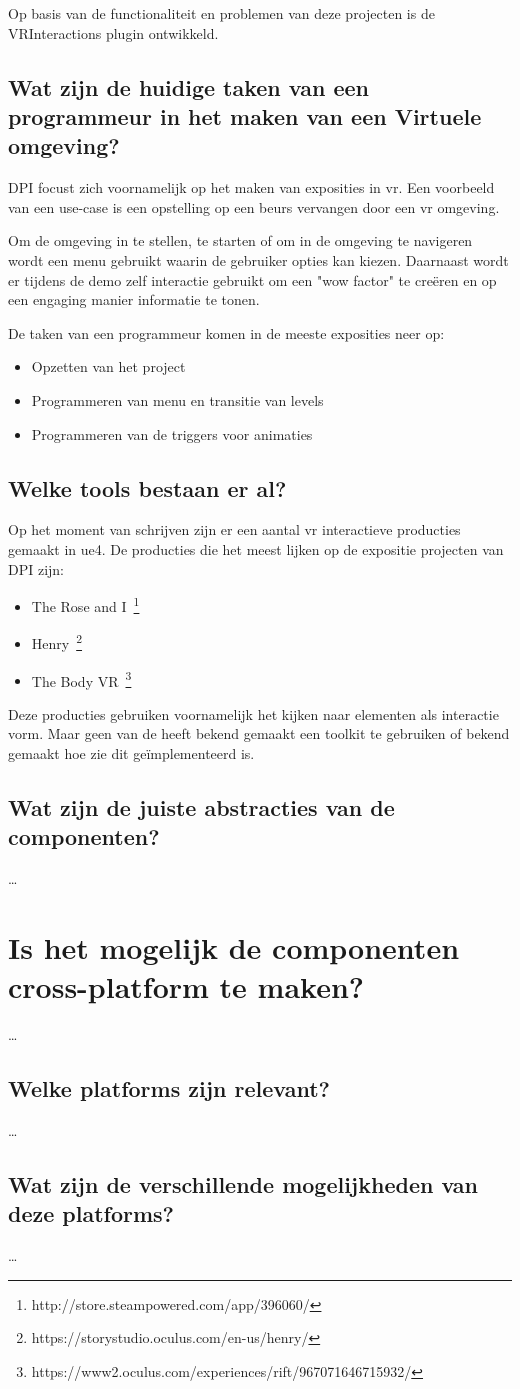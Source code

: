 Op basis van de functionaliteit en problemen van deze projecten is de VRInteractions plugin ontwikkeld.

\subsection{Wat zijn de huidige taken van een programmeur in het maken van een Virtuele omgeving?}
DPI focust zich voornamelijk op het maken van exposities in \gls{vr}. Een voorbeeld van een use-case is een opstelling op een beurs vervangen door een \gls{vr} omgeving.

Om de omgeving in te stellen, te starten of om in de omgeving te navigeren wordt een menu gebruikt waarin de gebruiker opties kan kiezen. Daarnaast wordt er tijdens de demo zelf interactie gebruikt om een "wow factor" te creëren en op een engaging manier informatie te tonen. 

De taken van een programmeur komen in de meeste exposities neer op:

\begin{itemize}
	\item Opzetten van het project
	\item Programmeren van menu en transitie van levels
	\item Programmeren van de triggers voor animaties 
\end{itemize}

\subsection{Welke tools bestaan er al?}
Op het moment van schrijven zijn er een aantal \gls{vr} interactieve producties gemaakt in \gls{ue4}. De producties die het meest lijken op de expositie projecten van DPI zijn:
 
\begin{itemize}
	\item The Rose and I~\footnote{http://store.steampowered.com/app/396060/}
	\item Henry~\footnote{https://storystudio.oculus.com/en-us/henry/}
	\item The Body VR~\footnote{https://www2.oculus.com/experiences/rift/967071646715932/}
\end{itemize}

Deze producties gebruiken voornamelijk het kijken naar elementen als interactie vorm. Maar geen van de heeft bekend gemaakt een toolkit te gebruiken of bekend gemaakt hoe zie dit geïmplementeerd is.

\subsection{Wat zijn de juiste abstracties van de componenten?}
\dots

\section{Is het mogelijk de componenten cross-platform te maken?}
\dots
\subsection{Welke platforms zijn relevant?}
\dots
\subsection{Wat zijn de verschillende mogelijkheden van deze platforms?}
\dots